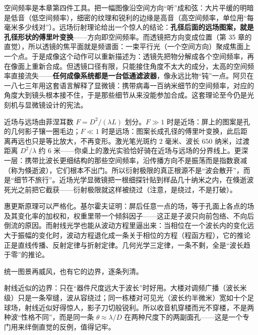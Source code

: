 \begin{mathbridge}
空间频率是本章第四件工具。把一幅图像沿空间方向“听”成和弦：大片平缓的明暗是低音（低空间频率），细密的纹理和锐利的边缘是高音（高空间频率，单位用“每毫米多少线对”）。远场衍射理论给出一个惊人的结论：\textbf{孔径后面的远场图案，就是孔径形状的傅里叶变换}——方向即空间频率。而透镜把方向变成位置（第 35 章的直觉），所以透镜的焦平面就是频谱面：一束平行光（一个空间方向）聚成焦面上一个点。于是成像这个动作可以重新描述为：透镜先把物分解成各个空间频率，再在像面上重新合成。但透镜口径有限，只能接住角度不太大的成分，太高的空间频率直接流失——\textbf{任何成像系统都是一台低通滤波器}，像永远比物“钝”一点。阿贝在一八七三年用这套语言解释了显微镜：携带病毒一百纳米细节的空间频率，对应的角度大到镜头根本接不住，于是那些细节从来没能参加合成。这套理论至今仍是光刻机与显微镜设计的宪法。
\end{mathbridge}

\begin{challenge}
近场与远场由菲涅耳数 \(F=D^2/(\lambda L)\) 划分。\(F\gg1\) 时是近场：屏上的图案是孔的几何影子镶一圈毛边；\(F\ll1\) 时是远场：图案长成孔径的傅里叶变换，此后距离再远也只是等比放大，不再变形。激光笔光斑约 \(2\) 毫米、波长 \(650\) 纳米，过渡距离 \(D^2/\lambda\) 约 \(6\) 米——你桌上的激光实验恰好骑在近场与远场的分界线上。更深一层：携带比波长更细结构的那些空间频率，沿传播方向不是振荡而是指数衰减（称为倏逝波），它们根本不出门。所以衍射极限的真正根源不是“波会散开”，而是“细节不旅行”。近场光学显微镜把一根细探针贴到样品几十纳米之内，在倏逝波死光之前把它截获——衍射极限就这样被绕过（注意，是绕过，不是打破）。
\end{challenge}

\begin{challenge}
惠更斯原理可以严格化。基尔霍夫证明：屏后任意一点的场，等于孔面上各点的场及其变化率的加权和，权重里带一个倾斜因子——这正是子波只向前包络、不向后倒流的原因。而射线光学也能从波动方程里逼出来：当相位在一个波长内的变化远大于振幅的变化时，波动方程退化成一条关于相位的方程（程函方程），它的推论正是直线传播、反射定律与折射定律。几何光学三定律，一条不剩，全是“波长趋于零”的推论。
\end{challenge}


统一图景再威风，也有它的边界，逐条列清。

射线近似的边界：只在“器件尺度远大于波长”时好用。大楼对调频广播（波长米级）只是一条窄缝，波从容绕过；同一栋楼对可见光（波长约半微米）宽如十个足球场，射线近似好得惊人，影子刀切般锐利。所以收音机穿楼而光不穿楼，不是两种波“性格不同”，而是同一条 \(\theta\approx\lambda/D\) 在两种尺度下的两副面孔——这是一个专门用来绊倒直觉的反例，值得记牢。

